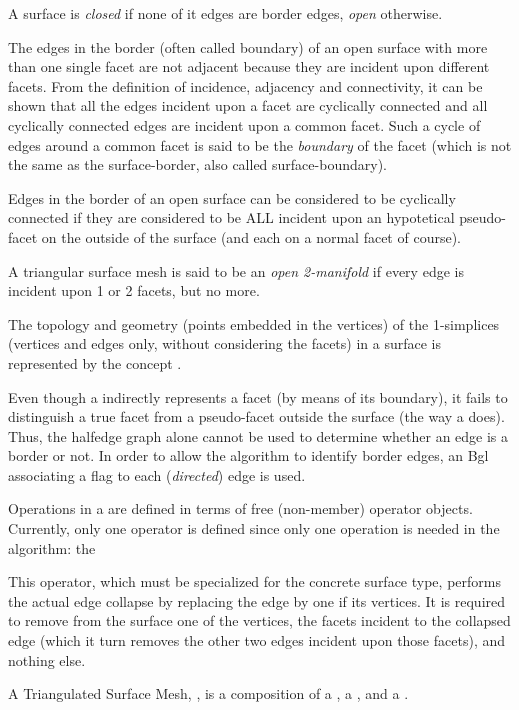 A surface is {\em closed} if none of it edges are border edges, {\em open} otherwise.

The edges in the border (often called boundary) of an open surface with more than one single facet are not adjacent because they are incident upon different facets. From the definition of incidence, adjacency and connectivity, it can be shown that all the edges incident upon a facet are cyclically connected and all cyclically connected edges are incident upon a common facet. Such a cycle of edges around a common facet is said to be the {\em boundary} of the facet (which is not the same as the surface-border, also called surface-boundary).

Edges in the border of an open surface can be considered to be cyclically connected if they are considered to be ALL  incident upon an hypotetical pseudo-facet on the outside of the surface (and each on a normal facet of course).

A triangular surface mesh is said to be an {\em open 2-manifold} if every edge is incident upon 1 or 2 facets, but no more.

The topology and geometry (points embedded in the vertices) of the 1-simplices (vertices and edges only, without considering the facets) in a surface is represented by the concept .

Even though a  indirectly represents a facet (by means of its boundary), it fails to distinguish a true facet from a pseudo-facet outside the surface (the way a  does). Thus, the halfedge graph alone cannot be used to determine whether an edge is a border or not. In order to allow the algorithm to identify border edges, an {\sc Bgl}  associating a  flag to each ({\em directed}) edge is used.

Operations in a  are defined in terms of free (non-member) operator objects. Currently, only one operator is defined since only one operation is needed in the algorithm: the 
 
This operator, which must be specialized for the concrete surface type, performs the actual edge collapse by replacing the edge by one if its vertices. It is required to remove from the surface one of the vertices, the facets incident to the collapsed edge (which it turn removes the other two edges incident upon those facets), and nothing else.

A Triangulated Surface Mesh, , is a composition of a , a , and a
.

